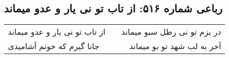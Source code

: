 \begin{center}
\section*{رباعی شماره ۵۱۶: از تاب تو نی یار و عدو میماند}
\label{sec:0516}
\begin{longtable}{l p{0.5cm} r}
از تاب تو نی یار و عدو میماند
&&
در بزم تو نی رطل سبو میماند
\\
جانا گیرم که خونم آشامیدی
&&
آخر به لب شهد تو بو میماند
\\
\end{longtable}
\end{center}
